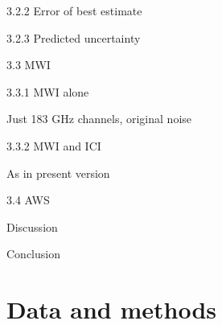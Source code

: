 \documentclass[amt, manuscript]{copernicus}
\begin{document}
3.2.2 Error of best estimate

3.2.3 Predicted uncertainty

3.3 MWI

3.3.1 MWI alone

Just 183 GHz channels, original noise

3.3.2 MWI and ICI

As in present version

3.4 AWS

 Discussion

 Conclusion


\newpage
\section{Data and methods}
\end{document}
